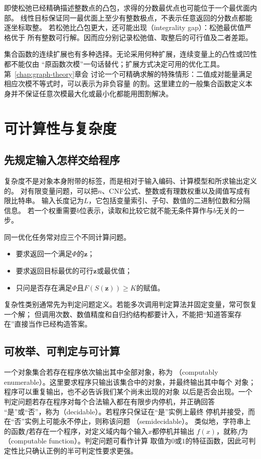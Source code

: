 即使松弛已经精确描述整数点的凸包，求得的分数最优点也可能位于一个最优面内部。
线性目标保证同一最优面上至少有整数极点，不表示任意返回的分数点都能逐坐标取整。
若松弛比凸包更大，还可能出现（integrality gap）：松弛最优值严格优于
所有整数可行解。因而应分别记录松弛值、取整后的可行值及二者差距。

集合函数的连续扩展也有多种选择。无论采用何种扩展，连续变量上的凸性或凹性都不能仅由
“原函数次模”一句话替代；扩展方式决定可用的优化工具。第~\ref{chap:graph-theory}章会
讨论一个可精确求解的特殊情形：二值成对能量满足相应次模不等式时，可以表示为非负容量
的割。这里建立的一般集合函数定义本身并不保证任意次模最大化或最小化都能用图割解决。

\section{可计算性与复杂度}
\label{sec:comb-computability-complexity}

\subsection{先规定输入怎样交给程序}

复杂度不是对象本身附带的标签，而是相对于输入编码、计算模型和所求输出定义的。
对有限变量问题，可以把$n$、CNF公式、整数或有理数权重以及阈值写成有限比特串。
输入长度记为$L$，它包括变量索引、子句、数值的二进制位数和分隔信息。
若一个权重需要$b$位表示，读取和比较它就不能无条件算作与$b$无关的一步。

同一优化任务常对应三个不同计算问题。
\begin{itemize}
  \item {}要求返回一个满足$\Phi$的$\bm{z}$；
  \item {}要求返回目标最优的可行$\bm{z}$或最优值；
  \item {}只问是否存在满足$\Phi$且$F(S(\bm{z}))\geq K$的赋值。
\end{itemize}
复杂性类别通常先为判定问题定义。若能多次调用判定算法并固定变量，常可恢复一个解；
但调用次数、数值精度和自归约结构都要计入，不能把“知道答案存在”直接当作已经构造答案。

\subsection{可枚举、可判定与可计算}

一个对象集合若存在程序依次输出其中全部对象，称为
（computably enumerable）。这里要求程序只输出该集合中的对象，并最终输出其中每个
对象；程序可以重复输出，也不必告诉我们某个尚未出现的对象
以后是否会出现。一个判定问题若存在程序对每个合法输入都在有限步内停机，并正确回答
“是”或“否”，称为（decidable）。若程序只保证在“是”实例上最终
停机并接受，而在“否”实例上可能永不停止，则称该问题
（semidecidable）。
类似地，字符串上的函数$f$若存在一个程序，对定义域内每个输入$x$都停机并输出
$f(x)$，就称$f$为（computable function）。判定问题可看作计算
取值为$0$或$1$的特征函数，因此可判定性比只确认正例的半可判定性要求更强。


